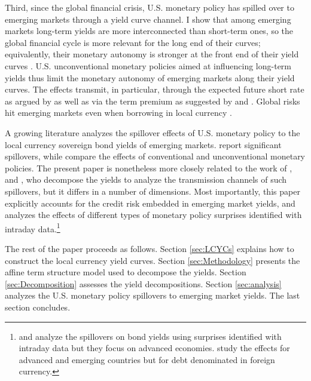 {Third, since the global financial crisis, U.S. monetary policy has spilled over to emerging markets through a yield curve channel. %
I show that among emerging markets long-term yields are more interconnected than short-term ones, %
so the global financial cycle is more relevant for the long end of their curves; equivalently, their monetary autonomy %
is stronger at the front end of their yield curves \citep{Obstfeld:2015}. U.S. unconventional monetary policies aimed at influencing long-term yields thus limit the monetary autonomy of emerging markets along their yield curves. The effects transmit, in particular, through the expected future short rate as argued by \cite{Kalemli-Ozcan:2019} as well as via the term premium as suggested by \cite{Turner:2014} and \cite{KolasaWesolowski:2020}. Global risks hit emerging markets even when borrowing in local currency \citep{CarstensShin:2019}.
 
A growing literature analyzes the spillover effects of U.S. monetary policy to the local currency sovereign bond yields of emerging markets. \cite{HausmanWongswan:2011} report significant spillovers, %
while \cite{BowmanLondonoSapriza:2015} compare the effects of 
conventional and unconventional monetary policies. The present paper is nonetheless more closely related to the work of \cite{CurcuruKaminLiRodriguez:2018}, \cite{ACDM:2019} and \cite{Albaglietal:2019}, who decompose the yields to analyze the transmission channels of such spillovers, but it differs in a number of dimensions. Most importantly, this paper explicitly accounts for the credit risk embedded in emerging market yields, and analyzes the effects of different types of monetary policy surprises identified with intraday data.\footnote{\cite{RogersScottiWright:2014} and \cite{RogersScottiWright:2018} analyze the spillovers on bond yields using surprises identified with intraday data but they focus on advanced economies. \cite{GilchristYueZakrajsek:2019} study the effects for advanced and emerging countries but for debt denominated in foreign currency.}

The rest of the paper proceeds as follows. 
Section \ref{sec:LCYCs} explains how to construct the local currency yield curves. Section \ref{sec:Methodology} presents the affine term structure model used to decompose the yields.
Section \ref{sec:Decomposition} assesses the yield decompositions.
Section \ref{sec:analysis} analyzes the U.S. monetary policy spillovers to emerging market yields.
The last section concludes.


}
